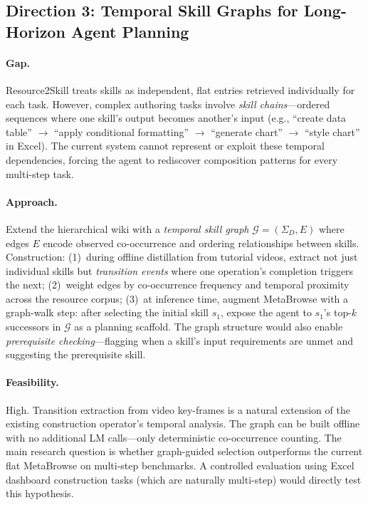 \documentclass[11pt,a4paper]{article}
\begin{document}
\subsection{Direction 3: Temporal Skill Graphs for Long-Horizon Agent Planning}

\paragraph{Gap.}
Resource2Skill treats skills as independent, flat entries retrieved individually for each task. However, complex authoring tasks involve \emph{skill chains}---ordered sequences where one skill's output becomes another's input (e.g., ``create data table'' $\to$ ``apply conditional formatting'' $\to$ ``generate chart'' $\to$ ``style chart'' in Excel). The current system cannot represent or exploit these temporal dependencies, forcing the agent to rediscover composition patterns for every multi-step task.

\paragraph{Approach.}
Extend the hierarchical wiki with a \emph{temporal skill graph} $\mathcal{G} = (\Sigma_D, E)$ where edges $E$ encode observed co-occurrence and ordering relationships between skills. Construction: (1)~during offline distillation from tutorial videos, extract not just individual skills but \emph{transition events} where one operation's completion triggers the next; (2)~weight edges by co-occurrence frequency and temporal proximity across the resource corpus; (3)~at inference time, augment MetaBrowse with a graph-walk step: after selecting the initial skill $s_1$, expose the agent to $s_1$'s top-$k$ successors in $\mathcal{G}$ as a planning scaffold. The graph structure would also enable \emph{prerequisite checking}---flagging when a skill's input requirements are unmet and suggesting the prerequisite skill.

\paragraph{Feasibility.}
High. Transition extraction from video key-frames is a natural extension of the existing construction operator's temporal analysis. The graph can be built offline with no additional LM calls---only deterministic co-occurrence counting. The main research question is whether graph-guided selection outperforms the current flat MetaBrowse on multi-step benchmarks. A controlled evaluation using Excel dashboard construction tasks (which are naturally multi-step) would directly test this hypothesis.
\end{document}
